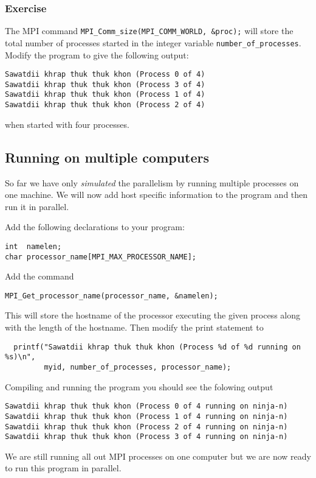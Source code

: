 \documentclass[12pt]{article}
\begin{document}
\subsubsection*{Exercise}
The MPI command \texttt{MPI\_Comm\_size(MPI\_COMM\_WORLD, \&proc);} will
store the total number of processes started in the integer variable
\texttt{number\_of\_processes}. Modify the program 
to give the following output:
\begin{verbatim}
Sawatdii khrap thuk thuk khon (Process 0 of 4)
Sawatdii khrap thuk thuk khon (Process 3 of 4)
Sawatdii khrap thuk thuk khon (Process 1 of 4)
Sawatdii khrap thuk thuk khon (Process 2 of 4)
\end{verbatim}
when started with four processes.
 

\subsection*{Running on multiple computers}  

So far we have only \emph{simulated} the parallelism by running 
multiple processes on one machine. 
We will now add host specific information to the program and then run it 
in parallel.

Add the following declarations to your program:
\begin{verbatim}
int  namelen;
char processor_name[MPI_MAX_PROCESSOR_NAME];
\end{verbatim}

Add the command
\begin{verbatim}
MPI_Get_processor_name(processor_name, &namelen);  
\end{verbatim}
This will store the hostname of the processor executing the given process 
along with the length of the hostname. Then modify the print statement to   
\begin{verbatim}
  printf("Sawatdii khrap thuk thuk khon (Process %d of %d running on %s)\n", 
         myid, number_of_processes, processor_name);
\end{verbatim}
Compiling and running the program you should see the folowing output
\begin{verbatim}
Sawatdii khrap thuk thuk khon (Process 0 of 4 running on ninja-n)
Sawatdii khrap thuk thuk khon (Process 1 of 4 running on ninja-n)
Sawatdii khrap thuk thuk khon (Process 2 of 4 running on ninja-n)
Sawatdii khrap thuk thuk khon (Process 3 of 4 running on ninja-n)
\end{verbatim}
We are still running all out MPI processes on one computer but we are 
now ready to run this program in parallel.
\end{document}
